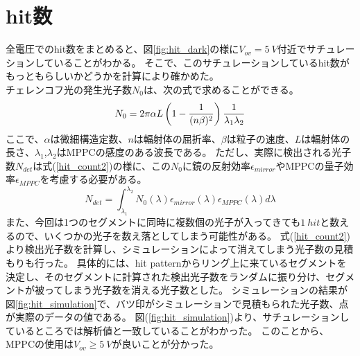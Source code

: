 \documentclass[uplatex, titlepage, dvipdfmx, 12pt, a4paper]{jsreport}
\begin{document}
  \section{hit数}
    全電圧でのhit数をまとめると、図\ref{fig:hit_dark}の様に$V_{ov}=\SI{5}{V}$付近でサチュレーションしていることがわかる。
    そこで、このサチュレーションしているhit数がもっともらしいかどうかを計算により確かめた。\\
    チェレンコフ光の発生光子数$N_{0}$は、次の式で求めることができる。
    \begin{equation}
        N_{0} = 2 \pi \alpha L  \left(1 - \frac{1}{(n\beta)^2}\right) \frac{1}{\lambda_1\lambda_2} \\
        \label{hit_count1}
    \end{equation}
    ここで、$\alpha$は微細構造定数、$n$は輻射体の屈折率、$\beta$は粒子の速度、$L$は輻射体の長さ、$\lambda_{1}$,$\lambda_{2}$はMPPCの感度のある波長である。
    ただし、実際に検出される光子数$N_{det}$は式(\ref{hit_count2})の様に、この$N_{0}$に鏡の反射効率$\epsilon_{mirror}$やMPPCの量子効率$\epsilon_{MPPC}$を考慮する必要がある。
    \begin{equation}
        N_{det} = \int^{\lambda_2}_{\lambda_1} N_{0}\left(\lambda\right) \epsilon_{mirror}\left(\lambda\right) \epsilon_{MPPC}\left(\lambda\right) d\lambda
        \label{hit_count2}
    \end{equation}
    また、今回は1つのセグメントに同時に複数個の光子が入ってきても$\SI{1}{hit}$と数えるので、いくつかの光子を数え落としてしまう可能性がある。
    式(\ref{hit_count2})より検出光子数を計算し、シミュレーションによって消えてしまう光子数の見積もりも行った。
    具体的には、hit patternからリング上に来ているセグメントを決定し、そのセグメントに計算された検出光子数をランダムに振り分け、セグメントが被ってしまう光子数を消える光子数とした。
    シミュレーションの結果が図\ref{fig:hit_simulation}で、バツ印がシミュレーションで見積もられた光子数、点が実際のデータの値である。
    図(\ref{fig:hit_simulation})より、サチュレーションしているところでは解析値と一致していることがわかった。
    このことから、MPPCの使用は$V_{ov} \ge \SI{5}{V}$が良いことが分かった。
\end{document}
